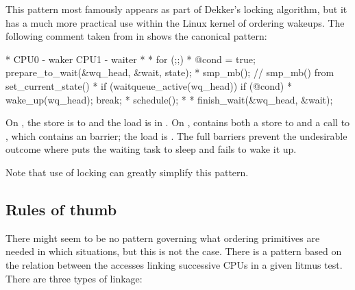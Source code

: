 This pattern most famously appears as part of Dekker's locking
algorithm, but it has a much more practical use within the Linux kernel
of ordering wakeups.
The following comment taken from  in
 shows the canonical pattern:

\begin{VerbatimU}
* CPU0 - waker                    CPU1 - waiter
*
*                                 for (;;) {
* @cond = true;                     prepare_to_wait(&wq_head, &wait, state);
* smp_mb();                         // smp_mb() from set_current_state()
* if (waitqueue_active(wq_head))         if (@cond)
*   wake_up(wq_head);                      break;
*                                   schedule();
*                                 }
*                                 finish_wait(&wq_head, &wait);
\end{VerbatimU}

On , the store is to  and the load is in .
On ,  contains both a store to 
and a call to , which contains an  barrier;
the load is .
The full barriers prevent the undesirable outcome where  puts the
waiting task to sleep and  fails to wake it up.

Note that use of locking can greatly simplify this pattern.


\subsection{Rules of thumb}

There might seem to be no pattern governing what ordering primitives are
needed in which situations, but this is not the case.
There is a pattern based on the relation between the accesses linking
successive CPUs in a given litmus test.
There are three types of linkage:

